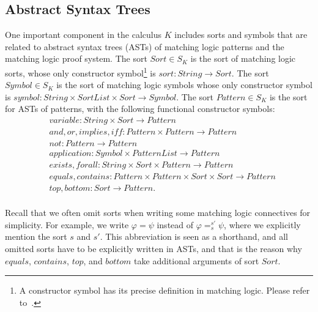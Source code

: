 \documentclass[UTF8]{article}
\theoremstyle{plain}
\theoremstyle{definition}
\theoremstyle{remark}
\begin{document}
\subsection{Abstract Syntax Trees}
One important component in the calculus $K$ includes sorts and symbols that are related to abstract syntax trees (ASTs) of matching logic patterns and the matching logic proof system. 
The sort $\mathit{Sort} \in S_K$ is the sort of matching logic sorts, whose only constructor symbol\footnote{A constructor symbol has its precise definition in matching logic. Please refer to~\cite{?}.} is $\mathit{sort} \colon \mathit{String} \to \mathit{Sort}$.
The sort $\mathit{Symbol} \in S_K$ is the sort of matching logic symbols whose
only constructor symbol is $\mathit{symbol} \colon \mathit{String} \times \mathit{SortList} \times \mathit{Sort} \to \mathit{Symbol}$. 
The sort $\mathit{Pattern} \in S_K$ is the sort for ASTs of patterns, with the 
following functional constructor symbols:
\begin{align*}
&\mathit{variable} \colon \mathit{String} \times \mathit{Sort} \to 
\mathit{Pattern} \\
&\mathit{and}, \mathit{or}, \mathit{implies}, \mathit{iff} \colon \mathit{Pattern} \times \mathit{Pattern} \to \mathit{Pattern} \\
&\mathit{not} \colon \mathit{Pattern} \to \mathit{Pattern} \\
&\mathit{application} \colon \mathit{Symbol} \times \mathit{PatternList} \to 
\mathit{Pattern} \\
&\mathit{exists}, \mathit{forall} \colon \mathit{String} \times 
\mathit{Sort} \times \mathit{Pattern} \to \mathit{Pattern} \\
&\mathit{equals}, \mathit{contains} \colon \mathit{Pattern} \times 
\mathit{Pattern} \times \mathit{Sort} \times \mathit{Sort} \to \mathit{Pattern} \\
&\mathit{top}, \mathit{bottom} \colon \mathit{Sort} \to \mathit{Pattern}. \\
\end{align*}

Recall that we often omit sorts when writing some matching logic connectives for simplicity.
For example, we write $\varphi = \psi$ instead of $\varphi =_{s}^{s'} \psi$, where we explicitly mention the sort $s$ and $s'$.
This abbreviation is seen as a shorthand, and all omitted sorts have to be explicitly written in ASTs, and that is the reason why $\mathit{equals}$, $\mathit{contains}$, $top$, and $bottom$ take additional arguments of sort $\mathit{Sort}$.
\end{document}
